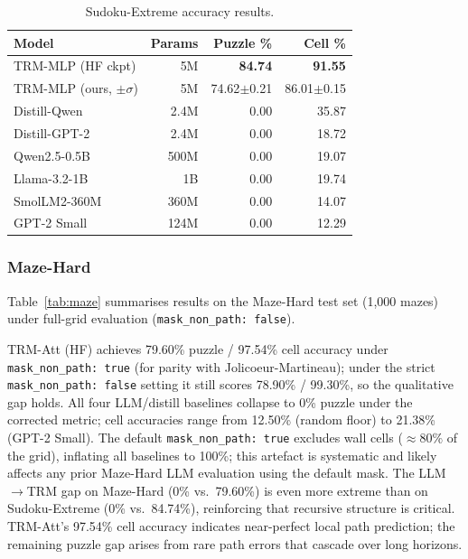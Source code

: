 \documentclass{article}
\begin{document}
\begin{table}[t]
\centering
\small
\begin{tabular}{lrrr}
\toprule
\textbf{Model} & \textbf{Params} & \textbf{Puzzle \%} & \textbf{Cell \%} \\
\midrule
TRM-MLP (HF ckpt)             & 5M    & \textbf{84.74}    & \textbf{91.55} \\
TRM-MLP (ours, $\pm\sigma$)   & 5M    & 74.62$\pm$0.21    & 86.01$\pm$0.15 \\
Distill-Qwen                  & 2.4M  & 0.00              & 35.87          \\
Distill-GPT-2                 & 2.4M  & 0.00              & 18.72          \\
Qwen2.5-0.5B                  & 500M  & 0.00              & 19.07          \\
Llama-3.2-1B                  & 1B    & 0.00              & 19.74          \\
SmolLM2-360M                  & 360M  & 0.00              & 14.07          \\
GPT-2 Small                   & 124M  & 0.00              & 12.29          \\
\bottomrule
\end{tabular}
\caption{Sudoku-Extreme accuracy results.}
\label{tab:sudoku}
\end{table}

\subsubsection{Maze-Hard}

Table~\ref{tab:maze} summarises results on the Maze-Hard test set (1{,}000 mazes) under full-grid evaluation (\texttt{mask\_non\_path: false}).

TRM-Att (HF) achieves 79.60\% puzzle / 97.54\% cell accuracy under \texttt{mask\_non\_path: true} (for parity with Jolicoeur-Martineau); under the strict \texttt{mask\_non\_path: false} setting it still scores 78.90\% / 99.30\%, so the qualitative gap holds. All four LLM/distill baselines collapse to 0\% puzzle under the corrected metric; cell accuracies range from 12.50\% (random floor) to 21.38\% (GPT-2 Small). The default \texttt{mask\_non\_path: true} excludes wall cells (${\approx}80\%$ of the grid), inflating all baselines to 100\%; this artefact is systematic and likely affects any prior Maze-Hard LLM evaluation using the default mask. The LLM$\to$TRM gap on Maze-Hard (0\% vs.\ 79.60\%) is even more extreme than on Sudoku-Extreme (0\% vs.\ 84.74\%), reinforcing that recursive structure is critical. TRM-Att's 97.54\% cell accuracy indicates near-perfect local path prediction; the remaining puzzle gap arises from rare path errors that cascade over long horizons.
\end{document}

